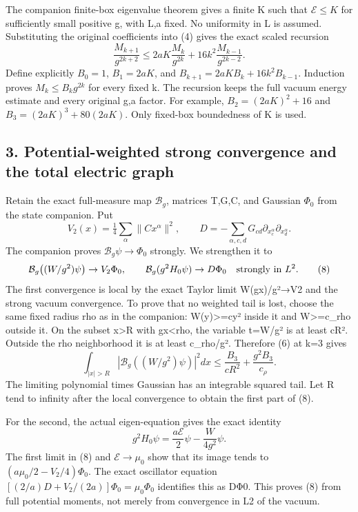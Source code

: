 \documentclass[
  11pt,
]{article}
\begin{document}
The companion finite-box eigenvalue theorem gives a finite K such that
\(\mathcal E\le K\) for sufficiently small positive g, with L,a fixed.
No uniformity in L is assumed. Substituting the original coefficients
into (4) gives the exact scaled recursion \[
 \frac{M_{k+1}}{g^{2k+2}}
 \le 2aK\frac{M_k}{g^{2k}}+
                 16k^2\frac{M_{k-1}}{g^{2k-2}}.             \tag{6}
\] Define explicitly \(B_0=1\), \(B_1=2aK\), and
\(B_{k+1}=2aK B_k+16k^2 B_{k-1}\). Induction proves
\(M_k\le B_k g^{2k}\) for every fixed k. The recursion keeps the full
vacuum energy estimate and every original g,a factor. For example,
\(B_2=(2aK)^2+16\) and \(B_3=(2aK)^3+80(2aK)\). Only fixed-box
boundedness of K is used.

\subsection{3. Potential-weighted strong convergence and the total
electric
graph}\label{weak-coupling-part-3-potential-weighted-strong-convergence-and-the-total-electric-graph}

Retain the exact full-measure map \(\mathcal B_g\), matrices T,G,C, and
Gaussian \(\Phi_0\) from the state companion. Put \[
 V_2(x)=\tfrac14\sum_\alpha\|Cx^\alpha\|^2,
 \qquad D=-\sum_{\alpha,c,d}G_{cd}
                         \partial_{x_c^\alpha}\partial_{x_d^\alpha}.
                                                               \tag{7}
\] The companion proves \(\mathcal B_g\psi\to\Phi_0\) strongly. We
strengthen it to \[
 \mathcal B_g\bigl((W/g^2)\psi\bigr)\to V_2\Phi_0,
 \qquad
 \mathcal B_g(g^2H_0\psi)\to D\Phi_0
                \quad\hbox{strongly in }L^2.                \tag{8}
\] The first convergence is local by the exact Taylor limit W(gx)/g²→V2
and the strong vacuum convergence. To prove that no weighted tail is
lost, choose the same fixed radius rho as in the companion:
W(y)\textgreater=c\textbar y\textbar² inside it and W\textgreater=c\_rho
outside it. On the subset \textbar x\textbar\textgreater R with
\textbar gx\textbar\textless rho, the variable t=W/g² is at least cR².
Outside the rho neighborhood it is at least c\_rho/g². Therefore (6) at
k=3 gives \[
 \int_{|x|>R}|\mathcal B_g((W/g^2)\psi)|^2dx
  \le \frac{B_3}{cR^2}+\frac{g^2B_3}{c_\rho}.             \tag{9}
\] The limiting polynomial times Gaussian has an integrable squared
tail. Let R tend to infinity after the local convergence to obtain the
first part of (8).

For the second, the actual eigen-equation gives the exact identity \[
 g^2H_0\psi=\frac{a\mathcal E}{2}\psi-\frac{W}{4g^2}\psi.
                                                               \tag{10}
\] The first limit in (8) and \(\mathcal E\to\mu_0\) show that its image
tends to \((a\mu_0/2-V_2/4)\Phi_0\). The exact oscillator equation
\([(2/a)D+V_2/(2a)]\Phi_0=\mu_0\Phi_0\) identifies this as DΦ0. This
proves (8) from full potential moments, not merely from convergence in
L2 of the vacuum.
\end{document}
